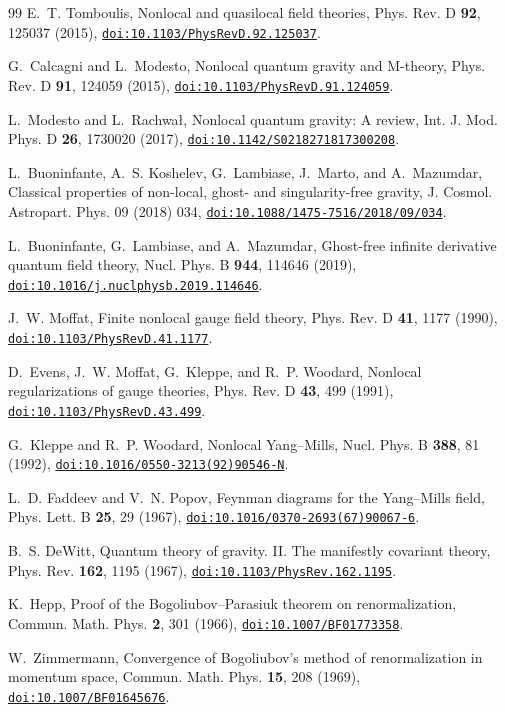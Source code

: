 \documentclass[a4paper,11pt]{article}
\newcommand{\doilink}[1]{\href{https://doi.org/#1}{\nolinkurl{doi:#1}}}
\begin{document}
\begin{thebibliography}{99}
E.~T. Tomboulis, Nonlocal and quasilocal field theories, Phys. Rev. D \textbf{92}, 125037 (2015), \doilink{10.1103/PhysRevD.92.125037}.

G.~Calcagni and L.~Modesto, Nonlocal quantum gravity and M-theory, Phys. Rev. D \textbf{91}, 124059 (2015), \doilink{10.1103/PhysRevD.91.124059}.

L.~Modesto and L.~Rachwa{\l}, Nonlocal quantum gravity: A review, Int. J. Mod. Phys. D \textbf{26}, 1730020 (2017), \doilink{10.1142/S0218271817300208}.

L.~Buoninfante, A.~S. Koshelev, G.~Lambiase, J.~Marto, and A.~Mazumdar, Classical properties of non-local, ghost- and singularity-free gravity, J. Cosmol. Astropart. Phys. 09 (2018) 034, \doilink{10.1088/1475-7516/2018/09/034}.

L.~Buoninfante, G.~Lambiase, and A.~Mazumdar, Ghost-free infinite derivative quantum field theory, Nucl. Phys. B \textbf{944}, 114646 (2019), \doilink{10.1016/j.nuclphysb.2019.114646}.

J.~W. Moffat, Finite nonlocal gauge field theory, Phys. Rev. D \textbf{41}, 1177 (1990), \doilink{10.1103/PhysRevD.41.1177}.

D.~Evens, J.~W. Moffat, G.~Kleppe, and R.~P. Woodard, Nonlocal regularizations of gauge theories, Phys. Rev. D \textbf{43}, 499 (1991), \doilink{10.1103/PhysRevD.43.499}.

G.~Kleppe and R.~P. Woodard, Nonlocal Yang--Mills, Nucl. Phys. B \textbf{388}, 81 (1992), \doilink{10.1016/0550-3213(92)90546-N}.

L.~D. Faddeev and V.~N. Popov, Feynman diagrams for the Yang--Mills field, Phys. Lett. B \textbf{25}, 29 (1967), \doilink{10.1016/0370-2693(67)90067-6}.

B.~S. DeWitt, Quantum theory of gravity. II. The manifestly covariant theory, Phys. Rev. \textbf{162}, 1195 (1967), \doilink{10.1103/PhysRev.162.1195}.

K.~Hepp, Proof of the Bogoliubov--Parasiuk theorem on renormalization, Commun. Math. Phys. \textbf{2}, 301 (1966), \doilink{10.1007/BF01773358}.

W.~Zimmermann, Convergence of Bogoliubov's method of renormalization in momentum space, Commun. Math. Phys. \textbf{15}, 208 (1969), \doilink{10.1007/BF01645676}.


\end{thebibliography}
\end{document}
